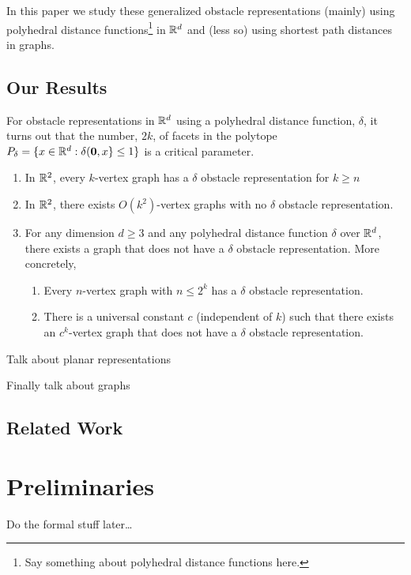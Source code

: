 \documentclass{patmorin}
\begin{document}
In this paper we study these generalized obstacle representations
(mainly) using polyhedral distance functions\footnote{Say something
about polyhedral distance functions here.} in $\mathbb{R}^d$ and (less so)
using shortest path distances in graphs.  

\subsection{Our Results}
For obstacle representations in $\mathbb{R}^d$ using a polyhedral distance function, $\delta$,
it turns out that the number, $2k$, of facets in the polytope $P_\delta=\{ x\in\mathbb{R}^d: \delta(\mathbf{0},x\}\le 1\}$ is a critical parameter. 

\begin{enumerate}
  \item In $\mathbb{R}^2$, every $k$-vertex graph has a $\delta$ obstacle
  representation for $k\ge n$

  \item In $\mathbb{R}^2$, there exists $O(k^2)$-vertex graphs with no $\delta$
  obstacle representation.

  \item For any dimension $d\ge 3$ and any polyhedral distance function
  $\delta$ over $\mathbb{R}^d$, there exists a graph that does not have a $\delta$
  obstacle representation.  More concretely, 
  \begin{enumerate}
     \item Every $n$-vertex graph with $n\le 2^k$ has a $\delta$
     obstacle representation.
     \item There is a universal constant $c$ (independent of $k$) such
     that there exists an $c^k$-vertex graph that does not have a $\delta$
     obstacle representation.
  \end{enumerate}
\end{enumerate}

Talk about planar representations


Finally talk about graphs


\subsection{Related Work}


\section{Preliminaries}



Do the formal stuff later\ldots
\end{document}
